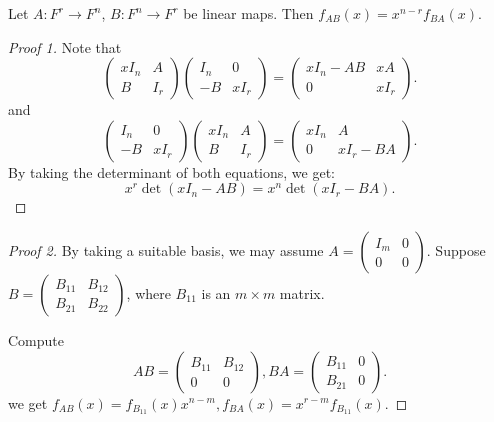 \begin{lemma}
	Let $A:F^r\to F^n$,  $B:F^n\to F^r$ be linear maps.
	Then $f_{AB}(x)=x^{n-r}f_{BA}(x)$.
\end{lemma}
\begin{proof}[Proof 1]
	Note that
    \[
    \begin{pmatrix}
		xI_n &A\\ B &I_r
    \end{pmatrix}
	\begin{pmatrix}
		I_n &0\\ -B &xI_r
	\end{pmatrix}
	=
	\begin{pmatrix}
		xI_n - AB &xA\\ 0 &xI_r
	\end{pmatrix}.
    \]
    and
	\[
	\begin{pmatrix}
		I_n &0\\ -B &xI_r
	\end{pmatrix}
	\begin{pmatrix}
		xI_n &A\\ B &I_r
	\end{pmatrix}
	=
	\begin{pmatrix}
		xI_n &A\\ 0 &xI_r -BA
	\end{pmatrix}.
	\]
	By taking the determinant of both equations, we get:
	\[
	x^r \det(xI_n - AB) = x^n \det(xI_r - BA).
	\]
\end{proof}
\begin{proof}[Proof 2]
    By taking a suitable basis, we may assume $A=\begin{pmatrix}
		I_m &0 \\ 0 &0 \end{pmatrix}$.
	Suppose $B=\begin{pmatrix}
		B_{11} &B_{12}\\ B_{21} &B_{22}
	\end{pmatrix}$, where $B_{11}$ is an $m \times m$ matrix.

	Compute
	\[
	AB = \begin{pmatrix}
		B_{11} &B_{12}\\0 &0
	\end{pmatrix},
	BA = \begin{pmatrix}
		B_{11} &0 \\ B_{21} &0
	\end{pmatrix}.
	\]
	we get $f_{AB}(x) = f_{B_{11}}(x)x^{n-m}, f_{BA}(x) =x^{r-m}f_{B_{11}}(x)$.
\end{proof}

